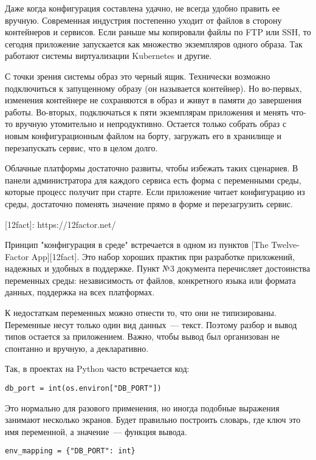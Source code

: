Даже когда конфигурация составлена удачно, не всегда удобно править ее
вручную. Современная индустрия постепенно уходит от файлов в сторону контейнеров
и сервисов. Если раньше мы копировали файлы по FTP или SSH, то сегодня
приложение запускается как множество экземпляров одного образа. Так работают
системы виртуализации Kubernetes и другие.

С точки зрения системы образ это черный ящик. Технически возможно подключиться к
запущенному образу (он называется контейнер). Но во-первых, изменения контейнере
не сохраняются в образ и живут в памяти до завершения работы. Во-вторых,
подключаться к пяти экземплярам приложения и менять что-то вручную утомительно и
непродуктивно. Остается только собрать образ с новым конфигурационным файлом на
борту, загружать его в хранилище и перезапускать сервис, что в целом долго.

Облачные платформы достаточно развиты, чтобы избежать таких сценариев. В панели
администратора для каждого сервиса есть форма с переменными среды, которые
процесс получит при старте. Если приложение читает конфигурацию из среды,
достаточно поменять значение прямо в форме и перезагрузить сервис.

[12fact]: https://12factor.net/

Принцип "конфигурация в среде" встречается в одном из пунктов [The Twelve-Factor
App][12fact]. Это набор хороших практик при разработке приложений, надежных и
удобных в поддержке. Пункт №3 документа перечисляет достоинства переменных
среды: независимость от файлов, конкретного языка или формата данных, поддержка
на всех платформах.

К недостаткам переменных можно отнести то, что они не типизированы. Переменные
несут только один вид данных~--- текст. Поэтому разбор и вывод типов остается за
приложением. Важно, чтобы вывод был организован не спонтанно и вручную, а
декларативно.

Так, в проектах на Python часто встречается код:

\begin{verbatim}
db_port = int(os.environ["DB_PORT"])
\end{verbatim}

Это нормально для разового применения, но иногда подобные выражения занимают
несколько экранов. Будет правильно построить словарь, где ключ это имя
переменной, а значение~--- функция вывода.

\begin{verbatim}
env_mapping = {"DB_PORT": int}
\end{verbatim}

